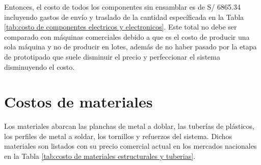 Entonces, el costo de todos los componentes sin ensamblar es de S/ 6865.34 incluyendo gastos de envío y traslado de la cantidad específicada en la Tabla \ref{tab:costo de componentes electricos y electronicos}. Este total no debe ser comparado con máquinas comerciales debido a que es el costo de producir una sola máquina y no de producir en lotes, además de no haber pasado por la etapa de prototipado que suele disminuir el precio y perfeccionar el sistema disminuyendo el costo.

\section{Costos de materiales}

Los materiales abarcan las planchas de metal a doblar, las tuberías de plásticos, los perfiles de metal a soldar, los tornillos y refuerzos del sistema. Dichos materiales son listados con su precio comercial actual en los mercados nacionales en la Tabla \ref{tab:costo de materiales estructurales y tuberias}.

